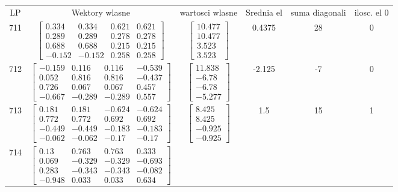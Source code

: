 \documentclass[a4paper,12pt]{article}
\begin{document}
\bgroup {} \vspace{0.2in} \begin{tabular}{c c c c c c}
LP &Wektory wlasne & wartosci wlasne & Srednia el & suma diagonali & ilosc. el 0\\
711
&
$\begin{bmatrix} 0.334 & 0.334 & 0.621 & 0.621 \\ 0.289 & 0.289 & 0.278 & 0.278 \\ 0.688 & 0.688 & 0.215 & 0.215 \\ -0.152 & -0.152 & 0.258 & 0.258 \end{bmatrix}$
&
$\begin{bmatrix} 10.477 \\ 10.477 \\ 3.523 \\ 3.523 \end{bmatrix}$
&
0.4375
&
28
&
0
\\
712
&
$\begin{bmatrix} -0.159 & 0.116 & 0.116 & -0.539 \\ 0.052 & 0.816 & 0.816 & -0.437 \\ 0.726 & 0.067 & 0.067 & 0.457 \\ -0.667 & -0.289 & -0.289 & 0.557 \end{bmatrix}$
&
$\begin{bmatrix} 11.838 \\ -6.78 \\ -6.78 \\ -5.277 \end{bmatrix}$
&
-2.125
&
-7
&
0
\\
713
&
$\begin{bmatrix} 0.181 & 0.181 & -0.624 & -0.624 \\ 0.772 & 0.772 & 0.692 & 0.692 \\ -0.449 & -0.449 & -0.183 & -0.183 \\ -0.062 & -0.062 & -0.17 & -0.17 \end{bmatrix}$
&
$\begin{bmatrix} 8.425 \\ 8.425 \\ -0.925 \\ -0.925 \end{bmatrix}$
&
1.5
&
15
&
1
\\
714
&
$\begin{bmatrix} 0.13 & 0.763 & 0.763 & 0.333 \\ 0.069 & -0.329 & -0.329 & -0.693 \\ 0.283 & -0.343 & -0.343 & -0.082 \\ -0.948 & 0.033 & 0.033 & 0.634 \end{bmatrix}$

\end{tabular}
\end{document}
